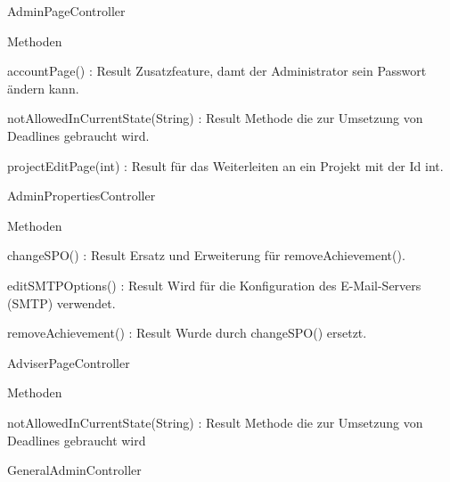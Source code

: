 \documentclass[parskip=full]{scrartcl}
\newcommand{\changeDescription}[1]{{\newline\color{black}\normalfont #1}}
\newcommand{\code}[1]{{\ttfamily #1}}
\begin{document}
\begin{itemPackage}
\begin{itemClass}
\item AdminPageController
\item \begin{itemClassSub}
\item Methoden
\begin{itemPlus}
\item accountPage() : Result \changeDescription{Zusatzfeature, damt der
Administrator sein Passwort ändern kann.}
\item notAllowedInCurrentState(String) : Result \changeDescription{Methode die
zur Umsetzung von Deadlines gebraucht wird.}
\end{itemPlus}
\begin{itemChange}
\item projectEditPage(int) : Result \changeDescription{\code{int} für das
Weiterleiten an ein Projekt mit der Id \code{int}. }
\end{itemChange}
\end{itemClassSub}
\item AdminPropertiesController
\item \begin{itemClassSub}
\item Methoden
\begin{itemPlus}
\item changeSPO() : Result \changeDescription{Ersatz und Erweiterung für
\code{removeAchievement()}. }
\item editSMTPOptions() : Result \changeDescription{Wird für die Konfiguration
des E-Mail-Servers (SMTP) verwendet.}
\end{itemPlus}
\begin{itemMinus}
\item removeAchievement() : Result \changeDescription{Wurde durch
\code{changeSPO()} ersetzt.}
\end{itemMinus}
\end{itemClassSub}
\item AdviserPageController
\item \begin{itemClassSub}
\item Methoden
\begin{itemPlus}
\item notAllowedInCurrentState(String) : Result \changeDescription{Methode die
zur Umsetzung von Deadlines gebraucht wird}
\end{itemPlus}
\end{itemClassSub}
\item GeneralAdminController
\item \begin{itemClassSub}

\end{itemClassSub}
\end{itemClass}
\end{itemPackage}
\end{document}
